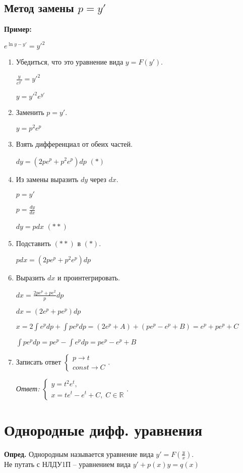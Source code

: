 \documentclass[10pt, a4paper]{article}
\begin{document}
\subsection{Метод замены $p = y'$}
\textbf{Пример:}
\par $e^{\ln{y} - y'} = y'^2$
\begin{enumerate}
    \item Убедиться, что это уравнение вида $y = F(y')$.
        \par $\frac{y}{e^{y'}} = y'^2$
        \par $y = y'^2e^{y'}$
    \item Заменить $p = y'$.
        \par $y = p^2e^p$
    \item Взять дифференциал от обеих частей.
        \par $dy = (2pe^p + p^2e^p)dp$ $(*)$
    \item Из замены выразить $dy$ через $dx$.
        \par $p = y'$
        \par $p = \frac{dy}{dx}$
        \par $dy = pdx$ $(**)$
    \item Подставить $(**)$ в $(*)$.
        \par $pdx = (2pe^p + p^2e^p)dp$
    \item Выразить $dx$ и проинтегрировать.
        \par $dx = \frac{2pe^p + pe^2}{p}dp$
        \par $dx = (2e^p + pe^p)dp$
        \par $x = 2\int{e^pdp} + \int{pe^pdp} = (2e^p + A) + (pe^p - e^p + B) = e^p + pe^p + C$
        \par $\int{pe^pdp} = pe^p - \int{e^pdp} = pe^p - e^p + B$
    \item Записать ответ
        $\begin{cases}
            p \rightarrow t \\
            const \rightarrow C
        \end{cases}$.
        \par\textit{Ответ:}
        $\begin{cases}
            y = t^2e^t, \\
            x = te^t - e^t + C,\;C \in \mathbb{R}
        \end{cases}$.
\end{enumerate}


\section{Однородные дифф. уравнения}
\textbf{Опред.} Однородным называется уравнение вида $y' = F(\frac{y}{x})$. \\
Не путать с НЛДУ1П -- уравнением вида $y' + p(x)y = q(x)$
\end{document}
